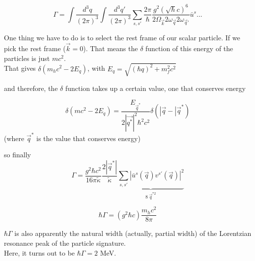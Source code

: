 \documentclass[11pt]{article}
\begin{document}
		 
		 \[ \Gamma = \int \frac{d^3 q}{(2\pi)^3} \int \frac{d^3 q'}{(2\pi)^3} \sum_{s,s'} \frac{2\pi}{\hbar} \frac{g^2 (\sqrt{\hbar}c)^6}{2\Omega_{\vec{k}}2\omega_{\vec{q}}2\omega_{\vec{q}'}}  \bar{u}^s ...\]


One thing we have to do is to select the rest frame of our scalar particle. If we pick the rest frame ($\vec{k} = 0$). That means the $\delta$ function of this energy of the particles is just $mc^2$.\\ That gives $\delta(m_hc^2 - 2E_{q})$, with $E_q = \sqrt{(\hbar q)^2 + m_f^2c^2}$

and therefore, the $\delta$ function takes up a certain value, one that conserves energy

		\[ \delta(mc^2 - 2E_q) = \frac{E_{\vec{q}^*}}{2|\vec{q^*}|^2\hbar^2 c^2} \delta (|\vec{q} - |\vec{q}^*)\] (where $\vec{q}^*$ is the value that conserves energy)


so finally \[ \Gamma = \frac{g^2 \hbar c^2}{16\pi \tilde{\kappa}} \frac{2|\vec{q}^*|}{\tilde{\kappa}}  \underbrace{ \sum_{s,s'} | \bar{u}^s (\vec{q}) v^{s'}(\vec{q}) |^2 }_{8\ \vec{q}^{*2}} \]

		
			\[ \hbar \Gamma = (g^2 \hbar c) \frac{m_h c^2}{8\pi}\]
		
		$\hbar \Gamma$ is also apparently the natural width (actually, partial width) of the Lorentzian resonance peak of the particle signature.\\
		
		Here, it turns out to be $\hbar \Gamma = 2$ MeV.
\end{document}

